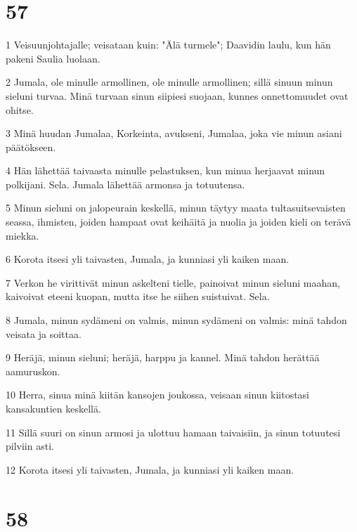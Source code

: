 \chapter{57}

\par 1 Veisuunjohtajalle; veisataan kuin: "Älä turmele"; Daavidin laulu, kun hän pakeni Saulia luolaan.
\par 2 Jumala, ole minulle armollinen, ole minulle armollinen; sillä sinuun minun sieluni turvaa. Minä turvaan sinun siipiesi suojaan, kunnes onnettomuudet ovat ohitse.
\par 3 Minä huudan Jumalaa, Korkeinta, avukseni, Jumalaa, joka vie minun asiani päätökseen.
\par 4 Hän lähettää taivaasta minulle pelastuksen, kun minua herjaavat minun polkijani. Sela. Jumala lähettää armonsa ja totuutensa.
\par 5 Minun sieluni on jalopeurain keskellä, minun täytyy maata tultasuitsevaisten seassa, ihmisten, joiden hampaat ovat keihäitä ja nuolia ja joiden kieli on terävä miekka.
\par 6 Korota itsesi yli taivasten, Jumala, ja kunniasi yli kaiken maan.
\par 7 Verkon he virittivät minun askelteni tielle, painoivat minun sieluni maahan, kaivoivat eteeni kuopan, mutta itse he siihen suistuivat. Sela.
\par 8 Jumala, minun sydämeni on valmis, minun sydämeni on valmis: minä tahdon veisata ja soittaa.
\par 9 Heräjä, minun sieluni; heräjä, harppu ja kannel. Minä tahdon herättää aamuruskon.
\par 10 Herra, sinua minä kiitän kansojen joukossa, veisaan sinun kiitostasi kansakuntien keskellä.
\par 11 Sillä suuri on sinun armosi ja ulottuu hamaan taivaisiin, ja sinun totuutesi pilviin asti.
\par 12 Korota itsesi yli taivasten, Jumala, ja kunniasi yli kaiken maan.

\chapter{58}

